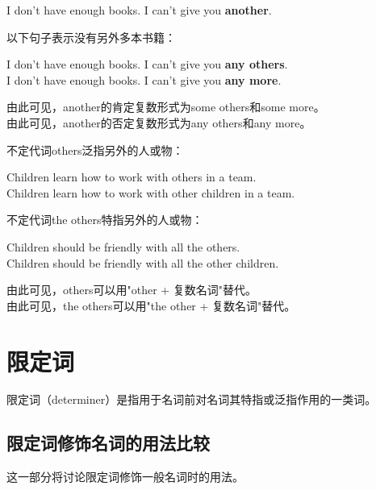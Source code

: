 \documentclass[UTF8]{ctexart}
\newcommand{\littf}[1]{{\hspace{3pt}\ttfamily #1}}
\begin{document}
    \begin{center}
        \large\ttfamily
        I don't have enough books. I can't give you \textbf{another}.\\[6mm]
    \end{center}
    以下句子表示没有另外多本书籍：
    \begin{center}
        \large\ttfamily
        I don't have enough books. I can't give you \textbf{any others}.\\[3mm]
        I don't have enough books. I can't give you \textbf{any more}.\\[6mm]
    \end{center}
    由此可见，\littf{another}的肯定复数形式为\littf{some others}和\littf{some more}。\\[3mm]
    由此可见，\littf{another}的否定复数形式为\littf{any others}和\littf{any more}。

\newpage

    不定代词\littf{others}泛指另外的人或物：
    \begin{center}
        \large\ttfamily
        Children learn how to work with others in a team.\\[3mm]
        Children learn how to work with other children in a team.\\[6mm]
    \end{center}
    不定代词\littf{the others}特指另外的人或物：
    \begin{center}
        \large\ttfamily
        Children should be friendly with all the others.\\[3mm]
        Children should be friendly with all the other children.\\[6mm]
    \end{center}
    由此可见，\littf{others}可以用\littf{"other + \hspace{0pt}复数名词"}替代。\\[3mm]
    由此可见，\littf{the others}可以用\littf{"the other + \hspace{0pt}复数名词"}替代。\\[3mm]

\newpage

\section{限定词}
    限定词（\littf{determiner}）是指用于名词前对名词其特指或泛指作用的一类词。

\subsection{限定词修饰名词的用法比较}
    这一部分将讨论限定词修饰一般名词时的用法。
\end{document}
